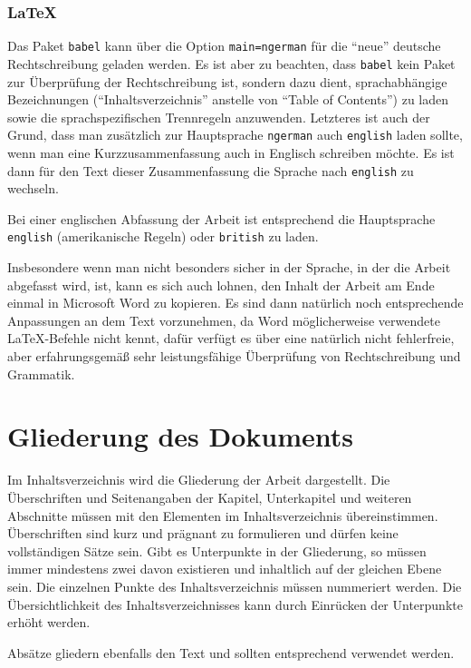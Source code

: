 \subsubsection*{\LaTeX}

Das Paket \verb|babel| kann über die Option \verb|main=ngerman| für die "`neue"' deutsche Rechtschreibung geladen werden.
Es ist aber zu beachten, dass \verb|babel| kein Paket zur Überprüfung der Rechtschreibung ist, sondern dazu dient, sprachabhängige Bezeichnungen (\zB "`Inhaltsverzeichnis"' anstelle von "`Table of Contents"') zu laden sowie die sprachspezifischen Trennregeln anzuwenden.
Letzteres ist auch der Grund, dass man zusätzlich zur Hauptsprache \verb|ngerman| auch \verb|english| laden sollte, wenn man eine Kurzzusammenfassung auch in Englisch schreiben möchte.
Es ist dann für den Text dieser Zusammenfassung die Sprache nach \verb|english| zu wechseln.

Bei einer englischen Abfassung der Arbeit ist entsprechend die Hauptsprache \verb|english| (amerikanische Regeln) oder \verb|british| zu laden.

Insbesondere wenn man nicht besonders sicher in der Sprache, in der die Arbeit abgefasst wird, ist, kann es sich auch lohnen, den Inhalt der Arbeit am Ende einmal in Microsoft Word zu kopieren.
Es sind dann natürlich noch entsprechende Anpassungen an dem Text vorzunehmen, da Word möglicherweise verwendete \LaTeX-Befehle nicht kennt, dafür verfügt es über eine natürlich nicht fehlerfreie, aber erfahrungsgemäß sehr leistungsfähige Überprüfung von Rechtschreibung und Grammatik.




\section{Gliederung des Dokuments}
\label{sec:Latex-Gliederung}
Im Inhaltsverzeichnis wird die Gliederung der Arbeit dargestellt.
Die Überschriften und Seitenangaben der Kapitel, Unterkapitel und weiteren Abschnitte müssen mit den Elementen im Inhaltsverzeichnis übereinstimmen.
Überschriften sind kurz und prägnant zu formulieren und dürfen keine vollständigen Sätze sein.
Gibt es Unterpunkte in der Gliederung, so müssen immer mindestens zwei davon existieren und inhaltlich auf der gleichen Ebene sein.
Die einzelnen Punkte des Inhaltsverzeichnis müssen nummeriert werden.
Die Übersichtlichkeit des Inhaltsverzeichnisses kann durch Einrücken der Unterpunkte erhöht werden.

Absätze gliedern ebenfalls den Text und sollten entsprechend verwendet werden.


